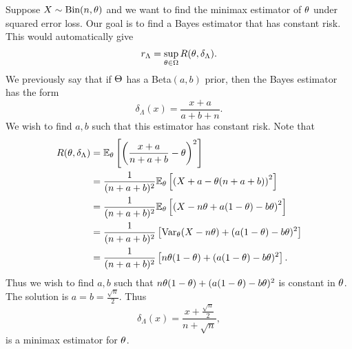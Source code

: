 \begin{ex}
    Suppose $X \sim \text{Bin}(n,{\theta})$ and we want to find the minimax estimator of ${\theta}$ under squared error loss. Our goal is to find a Bayes estimator that has constant risk. This would automatically give
    \[r_{\Lambda} = \sup_{{\theta} \in {{\Omega}}} R({\theta},\delta_{\Lambda}). \]
    We previously say that if ${\Theta}$ has a Beta$(a,b)$ prior, then the Bayes estimator has the form 
    \[\delta_\Lambda(x) = \frac{x+a}{a+b+n}.\]
    We wish to find $a,b$ such that this estimator has constant risk. Note that
    \begin{align*}
        R({\theta},\delta_\Lambda) &= {\mathbb{E}}_{\theta} \left[\left(\frac{x+a}{n+a+b}-{\theta}\right)^2\right]\\
        &=\frac{1}{(n+a+b)^2}{\mathbb{E}}_{\theta}\left[\left(X+a-{\theta}(n+a+b)\right)^2\right]\\
        &=\frac{1}{(n+a+b)^2}{\mathbb{E}}_{\theta}\left[\left(X-n{\theta} +a(1-{\theta})-b{\theta}\right)^2\right]\\
        &=\frac{1}{(n+a+b)^2}\left[\operatorname{Var}_{\theta}(X-n{\theta}) +(a(1-{\theta})-b{\theta})^2\right]\\
        &=\frac{1}{(n+a+b)^2}\left[n{\theta}(1-{\theta}) +(a(1-{\theta})-b{\theta})^2\right].
    \end{align*} 
    Thus we wish to find $a,b$ such that $n{\theta}(1-{\theta})+(a(1-{\theta})-b{\theta})^2$ is constant in ${\theta}$. The solution is $a=b=\frac{\sqrt{n}}{2}$. Thus
    \[\delta_\Lambda(x) = \frac{x+\frac{\sqrt{n}}{2}}{n+\sqrt{n}}, \]
    is a minimax estimator for ${\theta}$.
\end{ex}
